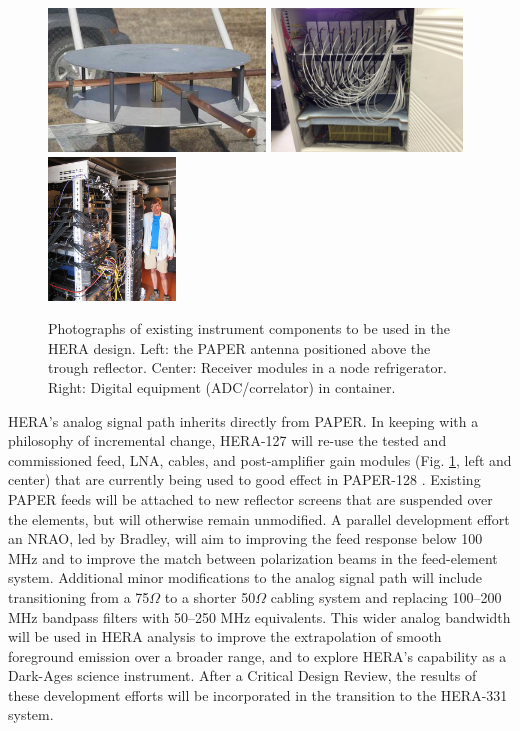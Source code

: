 \documentclass[preprint]{aastex}
\begin{document}
\begin{figure}[t]
    \centering
        \includegraphics[height=1.5in]{plots/new_antenna_closeup.jpg}
        \includegraphics[height=1.5in]{plots/Engineering/recv_node.png}
        \includegraphics[height=1.5in]{plots/Engineering/digital.png}
    \caption{\small
    Photographs of existing instrument components to be used in the HERA design.
    Left: the PAPER antenna positioned above the trough reflector.
    Center: Receiver modules in a node refrigerator.
    Right: Digital equipment (ADC/correlator) in container.}\label{fig:components}
\end{figure}

HERA's analog signal path inherits directly from PAPER.
In keeping with a philosophy of
incremental change,
HERA-127 will re-use the tested and commissioned feed, LNA, cables, and post-amplifier gain modules
(Fig. \ref{fig:components}, left and center) that are currently being
used to good effect in PAPER-128 \citep{parsons_et_al2010}.  Existing PAPER feeds will be attached to new
reflector screens that are suspended over the elements, but will otherwise remain unmodified.
A parallel development effort an NRAO, led by Bradley, will aim to improving the feed response below
100 MHz 
and to improve the match between polarization beams in the feed-element system.  
Additional
minor modifications to the analog signal path will include transitioning from a 75$\Omega$ to a
shorter 50$\Omega$ cabling system and replacing 100--200 MHz bandpass filters with 50--250 MHz equivalents.
This wider analog bandwidth will be used in HERA analysis to improve the extrapolation of smooth foreground
emission over a broader range, and to explore HERA's capability as a Dark-Ages science instrument.
After a Critical Design Review, the results of these development efforts will be incorporated in
the transition to the HERA-331 system.  
\end{document}
